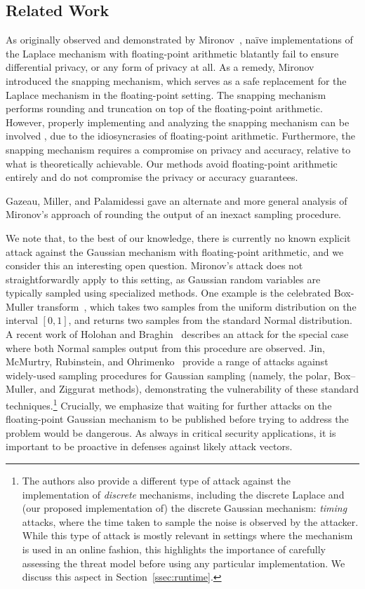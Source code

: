 \documentclass{jpcfinal} %
\begin{document}
\subsection{Related Work}
As originally observed and demonstrated by Mironov~\citep{Mironov12}, na\"ive implementations of the Laplace mechanism with floating-point arithmetic blatantly fail to ensure differential privacy, or any form of privacy at all. As a remedy, Mironov introduced the snapping mechanism, which serves as a safe replacement for the Laplace mechanism in the floating-point setting. The snapping mechanism performs rounding and truncation on top of the floating-point arithmetic. However, properly implementing and analyzing the snapping mechanism can be involved \citep{Covington19}, due to the idiosyncrasies of floating-point arithmetic. Furthermore, the snapping mechanism requires a compromise on privacy and accuracy, relative to what is theoretically achievable. Our methods avoid floating-point arithmetic entirely and do not compromise the privacy or accuracy guarantees.

Gazeau, Miller, and Palamidessi \cite{GazeauMP16} gave an alternate and more general analysis of Mironov's approach of rounding the output of an inexact sampling procedure.

We note that, to the best of our knowledge, there is currently no known explicit attack against the Gaussian mechanism with floating-point arithmetic, and we consider this an interesting open question. 
Mironov's attack does not straightforwardly apply to this setting, as Gaussian random variables are typically sampled using specialized methods. 
One example is the celebrated Box-Muller transform~\cite{BoxM58}, which takes two samples from the uniform distribution on the interval $[0,1]$, and returns two samples from the standard Normal distribution.
A recent work of Holohan and Braghin~\cite{HolohanB21} describes an attack for the special case where both Normal samples output from this procedure are observed.
Jin, McMurtry, Rubinstein, and Ohrimenko~\cite{JinMRO21} provide a range of attacks against widely-used sampling procedures for Gaussian sampling (namely, the polar, Box--Muller, and Ziggurat methods), demonstrating the vulnerability of these standard techniques.\footnote{The authors also provide a different type of attack against the implementation of \emph{discrete} mechanisms, including the discrete Laplace and (our proposed implementation of) the discrete Gaussian mechanism: \emph{timing} attacks, where the time taken to sample the noise is observed by the attacker. While this type of attack is mostly relevant in settings where the mechanism is used in an online fashion, this highlights the importance of carefully assessing the threat model before using any particular implementation. We discuss this aspect in Section~\ref{ssec:runtime}.}
Crucially, we emphasize that waiting for further attacks on the floating-point Gaussian mechanism to be published before trying to address the problem would be dangerous. As always in critical security applications, it is important to be proactive in defenses against likely attack vectors.
\end{document}
